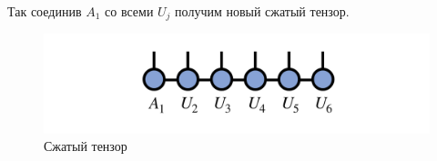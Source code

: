 Так соединив $A_1$ со всеми $U_j$ получим новый сжатый тензор.

\begin{figure}[h!tp]
\centering
\includegraphics[scale=0.3]{MatrixProductState_TensorTrain/compressed_mpstt.png}
\caption{Сжатый тензор}
\label{fig:ComprTensorDiag}
\end{figure}